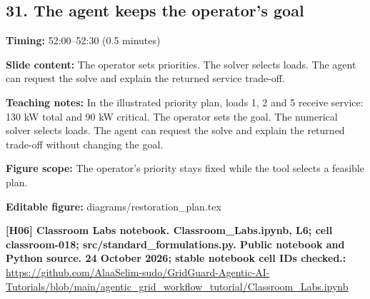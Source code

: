 \documentclass[10pt,letterpaper]{article}
\begin{document}
\subsection*{31. The agent keeps the operator's goal}
\textbf{Timing:} 52:00--52:30 (0.5 minutes)\par
\textbf{Slide content:} The operator sets priorities. The solver selects loads.
The agent can request the solve and explain the returned service trade-off.\par
\textbf{Teaching notes:} In the illustrated priority plan, loads 1, 2 and 5 receive service: 130 kW total and 90 kW critical. The operator sets the goal. The numerical solver selects loads. The agent can request the solve and explain the returned trade-off without changing the goal.\par
\textbf{Figure scope:} The operator's priority stays fixed while the tool selects a feasible plan.\par
\textbf{Editable figure:} diagrams/restoration\_plan.tex\par
\textbf{[H06] Classroom Labs notebook. Classroom\_Labs.ipynb, L6; cell classroom-018; src/standard\_formulations.py. Public notebook and Python source. 24 October 2026; stable notebook cell IDs checked.:} \href{https://github.com/AlaaSelim-sudo/GridGuard-Agentic-AI-Tutorials/blob/main/agentic_grid_workflow_tutorial/Classroom_Labs.ipynb}{\small\ttfamily https:/\allowbreak{}/\allowbreak{}github.\allowbreak{}com/\allowbreak{}AlaaSelim-\allowbreak{}sudo/\allowbreak{}GridGuard-\allowbreak{}Agentic-\allowbreak{}AI-\allowbreak{}Tutorials/\allowbreak{}blob/\allowbreak{}main/\allowbreak{}agentic\_\allowbreak{}grid\_\allowbreak{}workflow\_\allowbreak{}tutorial/\allowbreak{}Classroom\_\allowbreak{}Labs.\allowbreak{}ipynb}\par
\par\medskip
\end{document}
